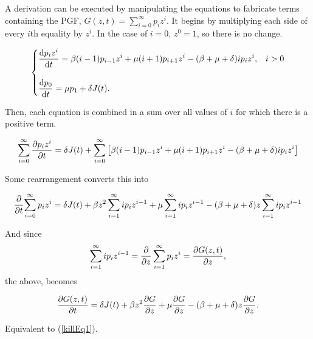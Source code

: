 \noindent
A derivation can be executed by manipulating the equations to fabricate terms containing the PGF, $G(z, t) = \sum^\infty_{i=0}p_i z^i$. It begins by multiplying each side of every $i$th equality by $z^i$. In the case of $i=0$, $z^0 = 1$, so there is no change. 


$$\begin{cases}
    \displaystyle\frac{{\rm d} p_iz^i}{{\rm d} t} = \beta (i-1) p_{i-1}z^i + \mu (i+1) p_{i+1}z^i - (\beta + \mu + \delta)ip_iz^i, & i > 0\\
   \\
    \displaystyle\frac{{\rm d} p_0}{{\rm d} t} = \mu p_1 +  \delta J(t).
\end{cases}$$

\noindent
Then, each equation is combined in a sum over all values of $i$ for which there is a positive term.

$$
\sum^\infty_{i=0} \displaystyle\frac{\partial p_iz^i}{\partial t} = \delta J(t)   + \sum^\infty_{i=0}\left[ \beta (i-1) p_{i-1}z^i + \mu (i+1) p_{i+1}z^i - (\beta + \mu + \delta)ip_iz^i\right]$$

\noindent
Some rearrangement converts this into 

$$\displaystyle\frac{\partial }{\partial t}{\sum^\infty_{i=0} p_iz^i } = \delta J(t) + \beta z^2 \sum^\infty_{i=1} ip_iz^{i-1} + \mu\sum^\infty_{i=1}ip_iz^{i-1} - (\beta +\mu+\delta)z\sum^\infty_{i=1}ip_iz^{i-1}$$

\noindent
And since
$$\sum^\infty_{i=1} ip_iz^{i-1}  = \displaystyle\frac{\partial }{\partial z}\sum^\infty_{i=1} p_iz^{i} = \displaystyle\frac{\partial G(z,t)}{\partial z},$$
the above, becomes 

$$\displaystyle\frac{\partial G(z,t)}{\partial t} = \delta J(t) +  \beta z^2\displaystyle\frac{\partial G}{\partial z}  + \mu\displaystyle\frac{\partial G}{\partial z} - (\beta + \mu + \delta)z\displaystyle\frac{\partial G}{\partial z}.$$

\noindent
Equivalent to (\ref{killEq1}).

